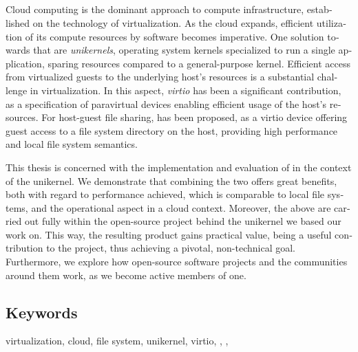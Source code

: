 \begin{otherlanguage}{english}
	\chapter*{\abstractname}
	Cloud computing is the dominant approach to compute infrastructure,
	established on the technology of virtualization. As the cloud expands,
	efficient utilization of its compute resources by software becomes
	imperative. One solution towards that are \emph{unikernels}, operating
	system kernels specialized to run a single application, sparing resources
	compared to a general-purpose kernel. Efficient access from virtualized
	guests to the underlying host's resources is a substantial challenge in
	virtualization. In this aspect, \emph{virtio} has been a significant
	contribution, as a specification of paravirtual devices enabling efficient
	usage of the host's resources. For host-guest file sharing, \emph{\viofs{}}
	has been proposed, as a virtio device offering guest access to a file system
	directory on the host, providing high performance and local file system
	semantics.

	This thesis is concerned with the implementation and evaluation of \viofs{}
	in the context of the \osv unikernel. We demonstrate that combining the two
	offers great benefits, both with regard to performance achieved, which
	is comparable to local file systems, and the operational aspect in a cloud
	context. Moreover, the above are carried out fully within the open-source
	project behind the unikernel we based our work on. This way, the resulting
	product gains practical value, being a useful contribution to the project,
	thus achieving a pivotal, non-technical goal. Furthermore, we explore how
	open-source software projects and the communities around them work, as we
	become active members of one.

	\section*{Keywords}
	\noindent
	virtualization, cloud, file system, unikernel, virtio, \osv{}, \viofs{},
	\qemu{}
\end{otherlanguage}
